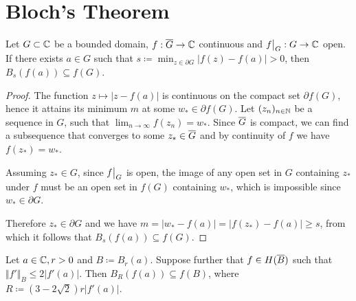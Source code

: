 \section{Bloch's Theorem}
\label{sec:blochs-theorem}

\begin{lemma} \label{lem:bloch-lemma-1}
    Let $G \subset \mathbb{C}$ be a bounded domain, $f : \overline{G} \to \mathbb{C}$ continuous and $\restr{f}{G} : G \to \C$ open. If there exists $a \in G$ such that $s \coloneqq \min_{z \in \partial G} \vert f(z) - f(a) \vert > 0$, then $B_{s}(f(a)) \subseteq f(G)$.
\end{lemma}

\begin{proof}
    The function $z \mapsto \vert z - f(a) \vert$ is continuous on the compact set $\partial f(G)$, hence it attains its minimum $m$ at some $w_* \in \partial f(G)$. Let $(z_n)_{n \in \mathbb{N}}$ be a sequence in $G$, such that $\lim_{n \to \infty} f(z_n) = w_*$. Since $\overline{G}$ is compact, we can find a subsequence that converges to some $z_* \in \overline{G}$ and by continuity of $f$ we have $f(z_*) = w_*$.

    Assuming $z_* \in G$, since $\restr{f}{G}$ is open, the image of any open set in $G$ containing $z_*$ under $f$ must be an open set in $f(G)$ containing $w_*$, which is impossible since $w_* \in \partial G$.

    Therefore $z_* \in \partial G$ and we have $m = \vert w_* - f(a) \vert = \vert f(z_*) - f(a) \vert \geq s$, from which it follows that $B_{s}(f(a)) \subseteq f(G)$.
\end{proof}

\begin{lemma} \label{lem:bloch-lemma-2}
    Let $a \in \mathbb{C}, r > 0$ and $B \coloneqq B_{r}(a)$. Suppose further that $f \in H(\overline{B})$ such that $\Vert f' \Vert_B \leq 2 \vert f'(a) \vert$. Then $ B_{R}(f(a)) \subseteq f(B)$, where $ R \coloneqq (3 - 2 \sqrt{2}) r \vert f'(a) \vert $.
\end{lemma}

